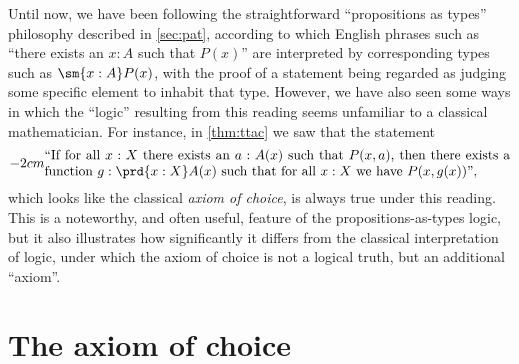 \label{subsec:pat?}

%
%
%
Until now, we have been following the straightforward ``propositions as types'' philosophy described in \cref{sec:pat}, according to which English phrases such as ``there exists an $x:A$ such that $P(x)$'' are interpreted by corresponding types such as $\sm{x:A} P(x)$, with the proof of a statement being regarded as judging some specific element to inhabit that type.
However, we have also seen some ways in which the ``logic'' resulting from this reading seems unfamiliar to a classical mathematician.
For instance, in \cref{thm:ttac} we saw that the statement
%
\begin{equation}\label{eq:english-ac}
  \parbox{\textwidth-2cm}{``If for all $x:X$ there exists an $a:A(x)$ such that $P(x,a)$, then there exists a function $g:\prd{x:X} A(x)$ such that for all $x:X$ we have $P(x,g(x))$'',}
\end{equation}
which looks like the classical \emph{axiom of choice}, is always true under this reading. This is a noteworthy, and often useful, feature of the propositions-as-types logic, but it also illustrates how significantly it differs from the classical interpretation of logic, under which the axiom of choice is not a logical truth, but an additional ``axiom''.


\section{The axiom of choice}
\label{sec:axiom-choice}

